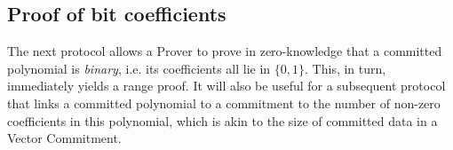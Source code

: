 \documentclass[11pt, lettersize, notitlepage, leqno, footskip=0.6cm]{article}
\newcommand{\mc}{\mathcal}
\newcommand{\vs}{\vspace{-0.15cm}}
\newcommand{\noin}{\noindent}
\newcommand{\op}{overwhelming probability}
\numberwithin{equation}{section}
\begin{document}
\begin{comment} We note that the Hadamard product protocol is \textit{partially} batchable in the following sense. For indices $i=1,\cdots, k$, the relations $\mc{R}_{\tt{HadProd}}[g_1,\;(a_{1},\;a_{i,2}),\; a_{i,1,2}]$ can be proven by demonstrating the single relation \vs $$ \mc{R}_{\tt{HadProd}}\big [g_1,\;\big(a_1 ,\; \prod\limits_{i=1}^{k} a_{i,2}^{\gamma^i} \big),\; \prod\limits_{i=1}^{k} a_{i,1,2}^{\gamma^{i}} \big]  $$ for a challenge $\gamma$ randomly generated by the Fiat-Shamir heuristic. This is because the following are equivalent with \op: \vspace{2mm}

\noin 1. $f_1(X)\;\odot \; f_{i,2}(X) \;=\; f_{i,1,2}(X)$ for each index $i=1,\cdots,k$. \vspace{1mm} 

\noin 2. $ f_{1}(X) \;\odot\; \big[\sum\limits_{i=1}^k \gamma^i\cdot f_{i,2}(X) \big]\;=\;  \big[\sum\limits_{i=1}^k \gamma^{i}\cdot f_{i,1,2}(X) \big]$  \vspace{2mm}

Furthermore, if polynomials $f_{i,1}(X)$, $f_{i,2}(X)$ are such that \vs $$k\cdot (\deg(f_i,1)+1),\;k\cdot (\deg(f_i,1)+1) \; < \;  \big| \hyperlink{CRS}{\tt{CRS}} \big|,$$ the relations \vs $$ f_{i,1}(X) \;\odot\; f_{i,2}(X) \; = \; f_{i,1,2}(X)  $$ can be proven by demonstrating the single relation \vs $$ \big[\sum\limits_{i=0}^{k-1} f_{i,1}(X)\cdot X^{N\cdot i} \big] \; \odot \; \big[\sum\limits_{i=0}^{k-1} f_{i,2}(X)\cdot X^{N\cdot i}\big] \; = \; \big[\sum\limits_{i=0}^{k-1} f_{i,1,2}(X)\cdot X^{N \cdot i} \big] $$ where $N:= \max\{\deg(f_{i,1}),\;\deg(f_{i,2})  \} + 1$.

\end{comment}




\subsection{\fontsize{11}{11}\selectfont Proof of bit coefficients }


The next protocol allows a Prover to prove in zero-knowledge that  a committed polynomial is \textit{binary}, i.e. its coefficients all lie in $\{0,1\}$. This, in turn, immediately yields a range proof. It will also be useful for a subsequent protocol that links a committed polynomial to a commitment to the number of non-zero coefficients in this polynomial, which is akin to the size of committed data in a Vector Commitment.
\end{document}
